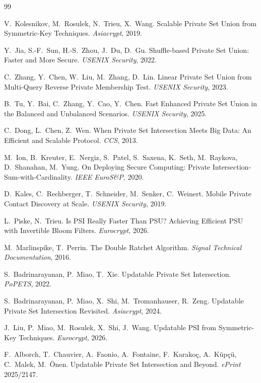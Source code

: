 \documentclass[letterpaper,twocolumn,10pt]{article}
\theoremstyle{definition}
\begin{document}
\begin{thebibliography}{99}

 V.~Kolesnikov, M.~Rosulek, N.~Trieu, X.~Wang.
\newblock Scalable Private Set Union from Symmetric-Key Techniques. \emph{Asiacrypt}, 2019.

 Y.~Jia, S.-F.~Sun, H.-S.~Zhou, J.~Du, D.~Gu.
\newblock Shuffle-based Private Set Union: Faster and More Secure. \emph{USENIX Security}, 2022.

 C.~Zhang, Y.~Chen, W.~Liu, M.~Zhang, D.~Lin.
\newblock Linear Private Set Union from Multi-Query Reverse Private Membership Test. \emph{USENIX Security}, 2023.

 B.~Tu, Y.~Bai, C.~Zhang, Y.~Cao, Y.~Chen.
\newblock Fast Enhanced Private Set Union in the Balanced and Unbalanced Scenarios. \emph{USENIX Security}, 2025.

 C.~Dong, L.~Chen, Z.~Wen.
\newblock When Private Set Intersection Meets Big Data: An Efficient and Scalable Protocol. \emph{CCS}, 2013.

 M.~Ion, B.~Kreuter, E.~Nergiz, S.~Patel, S.~Saxena, K.~Seth,
M.~Raykova, D.~Shanahan, M.~Yung.
\newblock On Deploying Secure Computing: Private Intersection-Sum-with-Cardinality. \emph{IEEE EuroS\&P}, 2020.

 D.~Kales, C.~Rechberger, T.~Schneider, M.~Senker, C.~Weinert.
\newblock Mobile Private Contact Discovery at Scale. \emph{USENIX Security}, 2019.

 L.~Piske, N.~Trieu.
\newblock Is PSI Really Faster Than PSU? Achieving Efficient PSU with Invertible Bloom Filters. \emph{Eurocrypt}, 2026.

 M.~Marlinspike, T.~Perrin.
\newblock The Double Ratchet Algorithm. \emph{Signal Technical Documentation}, 2016.

 S.~Badrinarayanan, P.~Miao, T.~Xie.
\newblock Updatable Private Set Intersection. \emph{PoPETS}, 2022.

 S.~Badrinarayanan, P.~Miao, X.~Shi, M.~Tromanhauser, R.~Zeng.
\newblock Updatable Private Set Intersection Revisited. \emph{Asiacrypt}, 2024.

 J.~Liu, P.~Miao, M.~Rosulek, X.~Shi, J.~Wang.
\newblock Updatable PSI from Symmetric-Key Techniques. \emph{Eurocrypt}, 2026.

 F.~Alborch, T.~Chauvier, A.~Faonio, A.~Fontaine, F.~Karako\c{c},
A.~K\"{u}p\c{c}\"{u}, C.~Malek, M.~\"{O}nen.
\newblock Updatable Private Set Intersection and Beyond. \emph{ePrint} 2025/2147.


\end{thebibliography}
\end{document}
